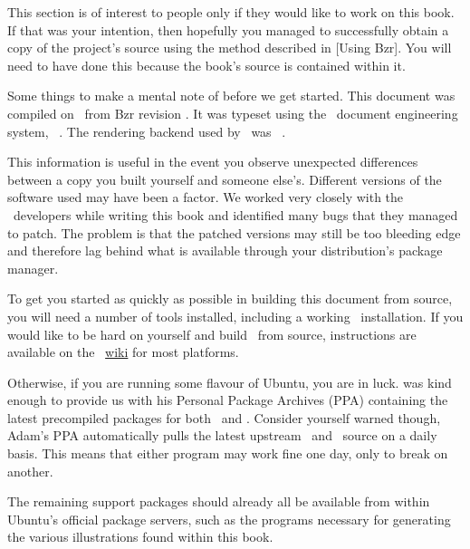 

This section is of interest to people only if they would like to work on this book. If that was your intention, then hopefully you managed to successfully obtain a copy of the project's source using the method described in [Using Bzr]. You will need to have done this because the book's source is contained within it.

Some things to make a mental note of before we get started. This document was compiled on \currentdate\ from Bzr revision \BzrRevisionClickable. It was typeset using the \CONTEXT\ document engineering system, \contextmark\ \contextversion. The rendering backend used by \contextmark\ was \texenginename\ \texengineversion. 

This information is useful in the event you observe unexpected differences between a copy you built yourself and someone else's. Different versions of the software used may have been a factor. We worked very closely with the \CONTEXT\ developers while writing this book and identified many bugs that they managed to patch. The problem is that the patched versions may still be too bleeding edge and therefore lag behind what is available through your distribution's package manager.

To get you started as quickly as possible in building this document from source, you will need a number of tools installed, including a working \CONTEXT\ installation. If you would like to be hard on yourself and build \CONTEXT\ from source, instructions are available on the \CONTEXT\ \href{http://wiki.contextgarden.net/ConTeXt_Minimals}{wiki} for most platforms. 

Otherwise, if you are running some flavour of Ubuntu, you are in luck.  was kind enough to provide us with his Personal Package Archives (PPA) containing the latest precompiled packages for both \CONTEXT\ and \texenginename. Consider yourself warned though, Adam's PPA automatically pulls the latest upstream \CONTEXT\ and \texenginename\ source on a daily basis. This means that either program may work fine one day, only to break on another.

The remaining support packages should already all be available from within Ubuntu's official package servers, such as the programs necessary for generating the various illustrations found within this book.

